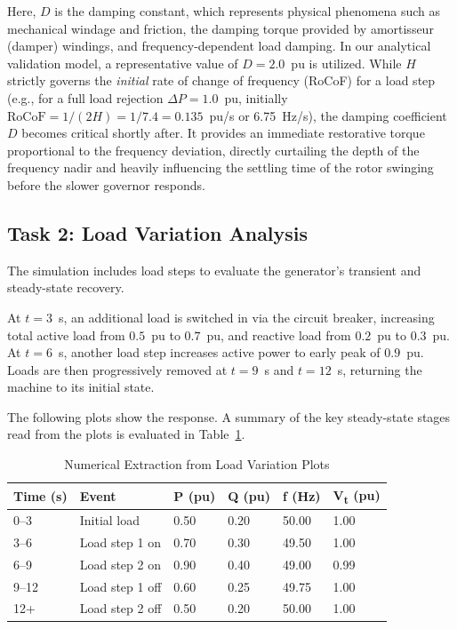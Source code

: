 \documentclass[12pt, a4paper]{article}
\begin{document}
Here, $D$ is the damping constant, which represents physical phenomena such as mechanical windage and friction, the damping torque provided by amortisseur (damper) windings, and frequency-dependent load damping. In our analytical validation model, a representative value of $D = 2.0$~pu is utilized. 
While $H$ strictly governs the \textit{initial} rate of change of frequency (RoCoF) for a load step (e.g., for a full load rejection $\Delta P = 1.0$~pu, initially $\text{RoCoF} = 1 / (2H) = 1 / 7.4 = 0.135$~pu/s or 6.75~Hz/s), the damping coefficient $D$ becomes critical shortly after. It provides an immediate restorative torque proportional to the frequency deviation, directly curtailing the depth of the frequency nadir and heavily influencing the settling time of the rotor swinging before the slower governor responds.

\subsection{Task 2: Load Variation Analysis}

The simulation includes load steps to evaluate the generator's transient and steady-state recovery. 

At $t = 3$~s, an additional load is switched in via the circuit breaker, increasing total active load from $0.5$~pu to $0.7$~pu, and reactive load from $0.2$~pu to $0.3$~pu. At $t = 6$~s, another load step increases active power to early peak of $0.9$~pu. Loads are then progressively removed at $t = 9$~s and $t = 12$~s, returning the machine to its initial state.

The following plots show the response. A summary of the key steady-state stages read from the plots is evaluated in Table~\ref{tab:load_steps}.

\begin{table}[H]
    \centering
    \caption{Numerical Extraction from Load Variation Plots}
    \begin{tabular}{llllll}
        \toprule
        \textbf{Time (s)} & \textbf{Event} & \textbf{P (pu)} & \textbf{Q (pu)} & \textbf{f (Hz)} & \textbf{V\textsubscript{t} (pu)} \\
        \midrule
        0--3   & Initial load    & 0.50 & 0.20 & 50.00 & 1.00 \\
        3--6   & Load step 1 on  & 0.70 & 0.30 & 49.50 & 1.00 \\
        6--9   & Load step 2 on  & 0.90 & 0.40 & 49.00 & 0.99 \\
        9--12  & Load step 1 off & 0.60 & 0.25 & 49.75 & 1.00 \\
        12+    & Load step 2 off & 0.50 & 0.20 & 50.00 & 1.00 \\
        \bottomrule
    \end{tabular}
    \label{tab:load_steps}
\end{table}
\end{document}
